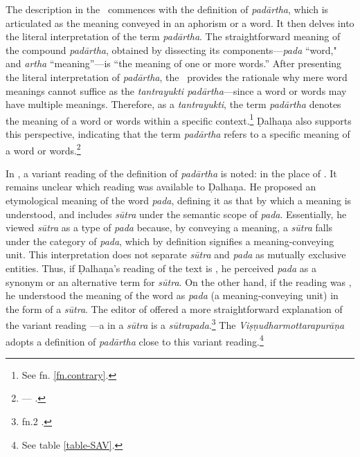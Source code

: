 The description in the \SS\ commences with the definition of \emph{padārtha}, 
which is articulated as the meaning conveyed in an aphorism or a word. It then 
delves into the literal interpretation of the term \emph{padārtha}. The 
straightforward meaning of the compound \emph{padārtha}, obtained by 
dissecting its components---\emph{pada} “word," and \emph{artha} 
“meaning”---is “the meaning of one or more words.” After presenting the literal 
interpretation of \emph{padārtha}, the \SS\ provides the rationale why mere 
word 
meanings cannot suffice as the \emph{tantrayukti padārtha}---since a word or 
words may have multiple meanings. Therefore, as a \emph{tantrayukti}, the 
term 
\emph{padārtha} denotes the meaning of a word or words within a specific 
context.\footnote{See fn. \ref{fn.contrary}.} 
Ḍalhaṇa also supports this perspective, indicating that the term 
\emph{padārtha} refers to a specific meaning of a word or 
words.\footnote{--- 
 .}
	
In \Su{}{}, a variant reading of the definition of \emph{padārtha} is noted: 
\dev{sūtrapade} in the place of \dev{sūtre pade vā}. It remains unclear which 
reading was available to Ḍalhaṇa. He proposed an etymological meaning of the 
word \emph{pada}, defining it as that by which a meaning is understood, and 
includes \emph{sūtra} under the semantic scope of \emph{pada}. Essentially, 
he 
viewed \emph{sūtra} as a type of \emph{pada} because, by conveying a 
meaning, 
a \emph{sūtra} falls under the category of \emph{pada}, which by definition 
signifies a meaning-conveying unit. This interpretation does not separate 
\emph{sūtra} and \emph{pada} as mutually exclusive entities.
Thus, if Ḍalhaṇa's reading of the text is , he perceived 
\emph{pada} as a synonym or an alternative term for \emph{sūtra}. On the 
other 
hand, if the reading was , he understood the meaning of the 
word 
 as \emph{pada} (a meaning-conveying unit) in the form of a 
\emph{sūtra}. The editor of \Su{}{} offered a more straightforward explanation 
of 
the variant reading ---a  in a \emph{sūtra} is a 
\emph{sūtrapada}.\footnote{ 
fn.2 
.} The \emph{Viṣṇudharmottarapurāṇa} adopts a definition of 
\emph{padārtha} close to this variant reading.\footnote{See table 
\ref{table-SAV}.}

